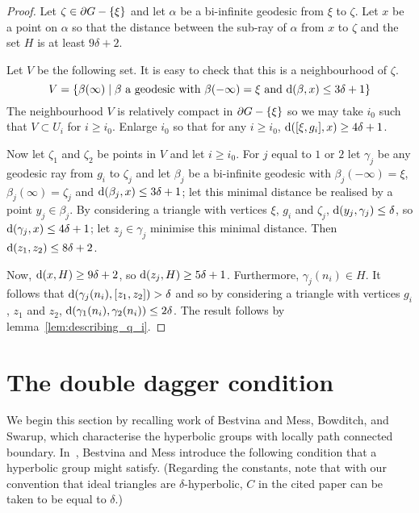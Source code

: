 \documentclass[a4paper]{article}
\begin{document}
\begin{proof}
  Let $\zeta \in \partial G - \left\{\xi\right\}$ and let $\alpha$ be a bi-infinite
  geodesic from $\xi$ to $\zeta$. Let $x$ be a point on $\alpha$ so that the
  distance between the sub-ray of $\alpha$ from $x$ to $\zeta$ and the set $H$
  is at least $9\delta+2$.

  Let $V$ be the following set. It is easy to check that this is a
  neighbourhood of $\zeta$.
  \begin{equation*}
    V = \left\{\beta(\infty) \mid \text{$\beta$ a geodesic with
            $\beta(-\infty) = \xi$ and $\operatorname{d}(\beta, x) \leq 3\delta+1$}\right\}
  \end{equation*}
  The neighbourhood $V$ is relatively compact in $\partial G - \left\{\xi\right\}$ so
  we may take $i_0$ such that $V \subset U_i$ for $i \geq i_0$. Enlarge $i_0$
  so that for any $i \geq i_0$, $\operatorname{d}([\xi, g_i], x) \geq 4\delta+1$.

  Now let $\zeta_1$ and $\zeta_2$ be points in $V$ and let $i \geq i_0$. For
  $j$ equal to $1$ or $2$ let $\gamma_j$ be any geodesic ray from $g_i$ to
  $\zeta_j$ and let $\beta_j$ be a bi-infinite geodesic with $\beta_j(-\infty) =
  \xi$, $\beta_j(\infty) = \zeta_j$ and $\operatorname{d}(\beta_j, x) \leq 3\delta+1$; let
  this minimal distance be realised by a point $y_j \in \beta_j$. By
  considering a triangle with vertices $\xi$, $g_i$ and $\zeta_j$, $\operatorname{d}(y_j,
  \gamma_j) \leq \delta$, so $\operatorname{d}(\gamma_j, x) \leq 4\delta+1$; let $z_j \in
  \gamma_j$ minimise this minimal distance. Then $\operatorname{d}(z_1, z_2) \leq
  8\delta+2$.

  Now, $\operatorname{d}(x, H) \geq 9\delta+2$, so $\operatorname{d}(z_j, H) \geq 5\delta+1$.
  Furthermore, $\gamma_j(n_i) \in H$. It follows that $\operatorname{d}(\gamma_j(n_i), [z_1,
  z_2]) > \delta$ and so by considering a triangle with vertices $g_i$, $z_1$
  and $z_2$, $\operatorname{d}(\gamma_1(n_i), \gamma_2(n_i)) \leq 2\delta$. The result
  follows by lemma~\ref{lem:describing_q_i}. 
\end{proof}

\section{The double dagger condition}\label{sec:double_dagger}

We begin this section by recalling work of Bestvina and Mess, Bowditch, and
Swarup, which characterise the hyperbolic groups with locally path connected
boundary. In~\cite{bestvinamess91}, Bestvina and Mess introduce the following
condition that a hyperbolic group might satisfy. (Regarding the constants,
note that with our convention that ideal triangles are $\delta$-hyperbolic,
$C$ in the cited paper can be taken to be equal to $\delta$.)
\end{document}
